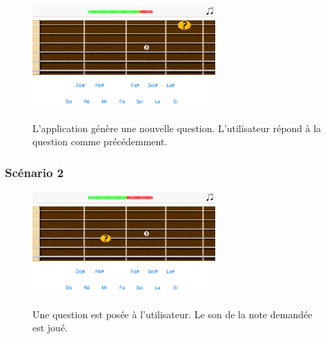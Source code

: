 \documentclass{scrreprt}
\begin{document}
\bigbreak


\begin{figure}[!ht]
  \begin{minipage}{0.55\linewidth}
    \includegraphics[width=7cm]{images/maquette_usecase/clavier/bonne_reponse_nouvelle_question.png}
  \end{minipage}\hfill
  \begin{minipage}{0.5\linewidth}
  {L'application génère une nouvelle question. L'utilisateur répond à la question comme précédemment.}
   \end{minipage}
\end{figure}

\newpage


\subsubsection{Scénario 2}

\begin{figure}[!ht]
  \begin{minipage}{0.55\linewidth}
    \includegraphics[width=7cm]{images/maquette_usecase/clavier/question.png}
  \end{minipage}\hfill
  \begin{minipage}{0.5\linewidth}
  {Une question est posée à l'utilisateur. Le son de la note demandée est joué.}
   \end{minipage}
\end{figure}

\bigbreak
\end{document}
